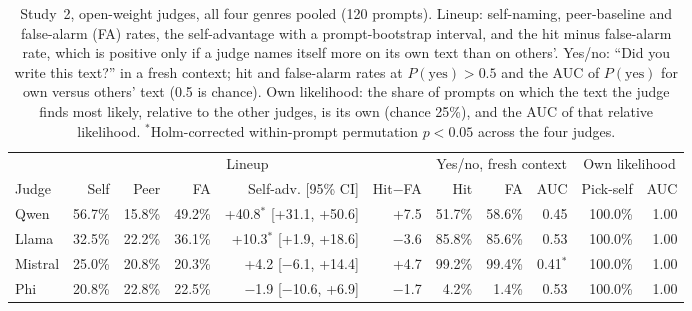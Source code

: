 \begin{table}[t]
\centering\small
\setlength\tabcolsep{3.5pt}
\begin{tabular}{l rrrrr rrr rr}
\toprule
 & \multicolumn{5}{c}{Lineup} & \multicolumn{3}{c}{Yes/no, fresh context} & \multicolumn{2}{c}{Own likelihood} \\
\cmidrule(lr){2-6}\cmidrule(lr){7-9}\cmidrule(lr){10-11}
Judge & Self & Peer & FA & Self-adv. [95\% CI] & Hit$-$FA & Hit & FA & AUC & Pick-self & AUC \\
\midrule
Qwen & 56.7\% & 15.8\% & 49.2\% & +40.8$^{*}$ [+31.1, +50.6] & +7.5 & 51.7\% & 58.6\% & 0.45 & 100.0\% & 1.00 \\
Llama & 32.5\% & 22.2\% & 36.1\% & +10.3$^{*}$ [+1.9, +18.6] & $-$3.6 & 85.8\% & 85.6\% & 0.53 & 100.0\% & 1.00 \\
Mistral & 25.0\% & 20.8\% & 20.3\% & +4.2 [$-$6.1, +14.4] & +4.7 & 99.2\% & 99.4\% & 0.41$^{*}$ & 100.0\% & 1.00 \\
Phi & 20.8\% & 22.8\% & 22.5\% & $-$1.9 [$-$10.6, +6.9] & $-$1.7 & 4.2\% & 1.4\% & 0.53 & 100.0\% & 1.00 \\
\bottomrule
\end{tabular}
\caption{Study~2, open-weight judges, all four genres pooled (120 prompts). Lineup: self-naming, peer-baseline and false-alarm (FA) rates, the self-advantage with a prompt-bootstrap interval, and the hit minus false-alarm rate, which is positive only if a judge names itself more on its own text than on others'. Yes/no: ``Did you write this text?'' in a fresh context; hit and false-alarm rates at $P(\text{yes})>0.5$ and the AUC of $P(\text{yes})$ for own versus others' text (0.5 is chance). Own likelihood: the share of prompts on which the text the judge finds most likely, relative to the other judges, is its own (chance 25\%), and the AUC of that relative likelihood. $^{*}$Holm-corrected within-prompt permutation $p<0.05$ across the four judges.}
\label{tab:openweight}
\end{table}
